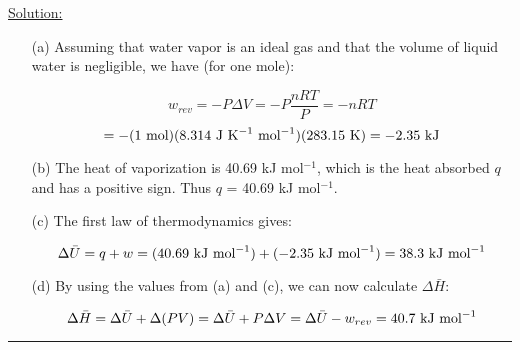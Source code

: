 \noindent
\underline{Solution:}\\

\begin{itemize}

\item[(a)] Assuming that water vapor is an ideal gas and that the volume of liquid water is negligible, we have (for one mole):

$$w_{rev} = -P\Delta V = -P\frac{nRT}{P} = -nRT$$
$$ = -(1\textnormal{ mol})(8.314\textnormal{ J K}^{-1}\textnormal{ mol}^{-1})(283.15\textnormal{ K}) = -2.35\textnormal{ kJ}$$

\item[(b)] The heat of vaporization is 40.69 kJ mol$^{-1}$, which is the heat absorbed $q$ and has a positive sign. Thus $q$ = 40.69 kJ mol$^{-1}$.

\item[(c)] The first law of thermodynamics gives:

$$\Delta\bar{U} = q + w = (40.69\textnormal{ kJ mol}^{-1}) + (-2.35\textnormal{ kJ mol}^{-1}) = 38.3\textnormal{ kJ mol}^{-1}$$

\item[(d)] By using the values from (a) and (c), we can now calculate $\Delta\bar{H}$:

$$\Delta\bar{H} = \Delta\bar{U} + \Delta(PV) = \Delta\bar{U} + P\Delta V = \Delta\bar{U} - w_{rev} = 40.7\textnormal{ kJ mol}^{-1}$$

\end{itemize}

\hrule\vspace{0.5cm}

